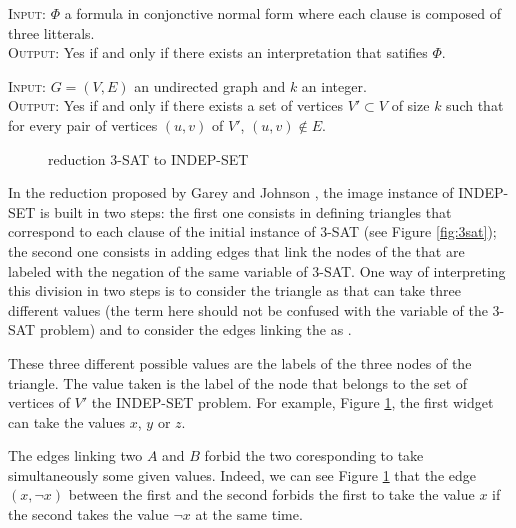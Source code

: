 \begin{definition}[3-SAT]
\textsc{Input:} $\Phi$ a formula in conjonctive normal form where each
clause is composed of three litterals. \\
\textsc{Output:} Yes if and only if there exists an interpretation
that satifies $\Phi$.\\
\end{definition}

\begin{definition} 
\textsc{Input:} $G=(V,E)$ an undirected graph and $k$ an integer.\\
\textsc{Output:} Yes if and only if there exists a set of vertices
$V' \subset V$ of size $k$ such that for every pair of vertices
$(u,v)$ of $V'$, $(u,v) \notin E$.\\
\end{definition}

\begin{figure}
  \centering
  
  \caption{reduction 3-SAT to INDEP-SET}
  \label{fig:indep-set}
\end{figure}

In the reduction proposed by Garey and Johnson \cite{garey}, the image
instance of INDEP-SET is built in two steps: the first one consists in
defining triangles that correspond to each clause of the initial
instance of 3-SAT (see Figure \ref{fig:3sat}); the second one consists
in adding edges that link the nodes of the \widgets that are labeled
with the negation of the same variable of 3-SAT. One way of
interpreting this division in two steps is to consider the triangle
\widgets as \variables that can take three different values (the
\variable term here should not be confused with the variable of the
3-SAT problem) and to consider the edges linking the \widgets as
\constraints.

These three different possible values are the labels of the three
nodes of the triangle. The value taken is the label of the node that
belongs to the set of vertices of $V'$ the INDEP-SET problem. For
example, Figure \ref{fig:indep-set}, the first widget can take the
values $x$, $y$ or $z$.

The edges linking two \widgets $A$ and $B$ forbid the two coresponding
\variables to take simultaneously some given values. Indeed, we can
see Figure \ref{fig:indep-set} that the edge $(x, \neg x)$ between the
first and the second \widgets forbids the first \widget to take the
value $x$ if the second takes the value $\neg x$ at the same time.

